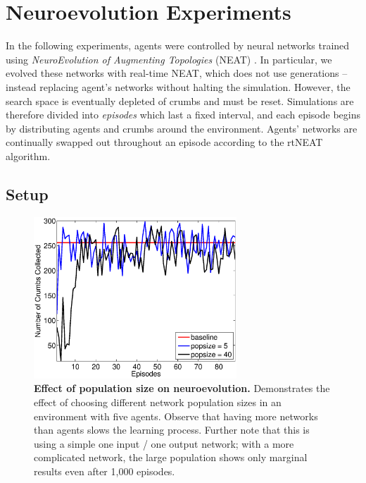 \documentclass[conference]{IEEEtran}
\begin{document}

\section{Neuroevolution Experiments}
\label{section:neuro}

In the following experiments, agents were controlled by neural networks
trained using \textit{NeuroEvolution of Augmenting Topologies} (NEAT)
\cite{stanley2002evolving}.
In particular, we evolved these networks with real-time NEAT, which does not use generations -- instead replacing agent's networks without halting the simulation. However, the search space is eventually depleted of crumbs and must be reset. Simulations are therefore divided into \textit{episodes} which last a fixed interval, and  each episode begins by distributing agents and crumbs around the environment. Agents' networks are continually swapped out throughout an episode according to the rtNEAT algorithm.

\subsection{Setup}

\begin{figure}[!t]
\centering
\includegraphics[width=3.0in]{./figures/neroevolution/pop_size.eps}
\caption{\textbf{Effect of population size on neuroevolution.} Demonstrates the effect of choosing different network population sizes in an environment with five agents. Observe that having more networks than agents slows the learning process. Further note that this is using a simple one input / one output network; with a more complicated network, the large population shows only marginal results even after 1,000 episodes.}
\label{neroevolution:pop_size}
\end{figure}
\end{document}
